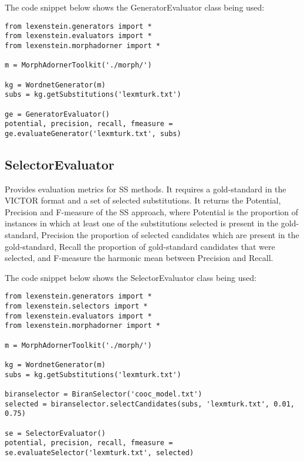 The code snippet below shows the GeneratorEvaluator class being used:

\begin{lstlisting}
from lexenstein.generators import *
from lexenstein.evaluators import *
from lexenstein.morphadorner import *

m = MorphAdornerToolkit('./morph/')

kg = WordnetGenerator(m)
subs = kg.getSubstitutions('lexmturk.txt')

ge = GeneratorEvaluator()
potential, precision, recall, fmeasure = ge.evaluateGenerator('lexmturk.txt', subs)
\end{lstlisting}













\subsection{SelectorEvaluator}

Provides evaluation metrics for SS methods. It requires a gold-standard in the VICTOR format and a set of selected substitutions. It returns the Potential, Precision and F-measure of the SS approach, where Potential is the proportion of instances in which at least one of the substitutions selected is present in the gold-standard, Precision the proportion of selected candidates which are present in the gold-standard, Recall the proportion of gold-standard candidates that were selected, and F-measure the harmonic mean between Precision and Recall.

The code snippet below shows the SelectorEvaluator class being used:

\begin{lstlisting}
from lexenstein.generators import *
from lexenstein.selectors import *
from lexenstein.evaluators import *
from lexenstein.morphadorner import *

m = MorphAdornerToolkit('./morph/')

kg = WordnetGenerator(m)
subs = kg.getSubstitutions('lexmturk.txt')

biranselector = BiranSelector('cooc_model.txt')
selected = biranselector.selectCandidates(subs, 'lexmturk.txt', 0.01, 0.75)

se = SelectorEvaluator()
potential, precision, recall, fmeasure = se.evaluateSelector('lexmturk.txt', selected)
\end{lstlisting}









